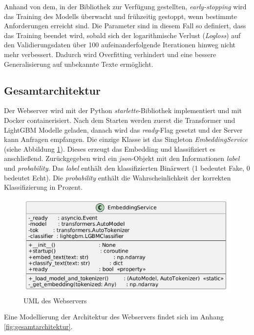 Anhand von dem, in der Bibliothek zur Verfügung gestellten, \textit{early-stopping} wird das Training des Modells überwacht und frühzeitig gestoppt, wenn bestimmte 
Anforderungen erreicht sind. 
Die Parameter sind in diesem Fall so definiert, dass das Training beendet wird, sobald sich der logarithmische Verlust (\textit{Logloss}) auf den 
Validierungsdaten über 100 aufeinanderfolgende Iterationen hinweg nicht mehr verbessert.
Dadurch wird Overfitting verhindert und eine bessere Generalisierung auf unbekannte Texte ermöglicht.

\subsection{Gesamtarchitektur}

Der Webserver wird mit der Python \textit{starlette}-Bibliothek implementiert und mit Docker containerisiert.
Nach dem Starten werden zuerst die Transformer und LightGBM Modelle geladen, danach wird das \textit{ready}-Flag gesetzt und der Server kann Anfragen empfangen.
Die einzige Klasse ist das Singleton \textit{EmbeddingService} (siehe Abbildung \ref{fig:uml_webserver}). Dieses erzeugt das Embedding und klassifiziert es anschließend.
Zurückgegeben wird ein \textit{json}-Objekt mit den Informationen \textit{label} und \textit{probability}. Das \textit{label} enthält den klassifizierten Binärwert 
(1 bedeutet Fake, 0 bedeutet Echt). Die \textit{probability} enthält die Wahrscheinlichkeit der korrekten Klassifizierung in Prozent.

\begin{figure}[htbp]
    \begin{center}
        \includegraphics[scale=0.55]{static/uml_webserver.png}
        \caption{\label{fig:uml_webserver} UML des Webservers}
    \end{center}
\end{figure}

Eine Modellierung der Architektur des Webservers findet sich im Anhang \ref{fig:gesamtarchitektur}.

